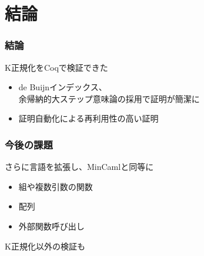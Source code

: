 \documentclass[dvipdfmx,cjk,xcolor=dvipsnames,envcountsect,notheorems,12pt]{beamer}
\theoremstyle{definition}
\begin{document}
\section{結論}

\begin{frame}
	\frametitle{結論}
	\Large K正規化をCoqで検証できた
	\begin{itemize}
		\item de Buijnインデックス、\\余帰納的大ステップ意味論の採用で証明が簡潔に
		\item 証明自動化による再利用性の高い証明
	\end{itemize}
\end{frame}

\begin{frame}
	\frametitle{今後の課題}
	\Large さらに言語を拡張し、MinCamlと同等に
	\begin{itemize}
		\item 組や複数引数の関数
		\item 配列
		\item 外部関数呼び出し
	\end{itemize}

	\vfill

	K正規化以外の検証も
\end{frame}
\end{document}
